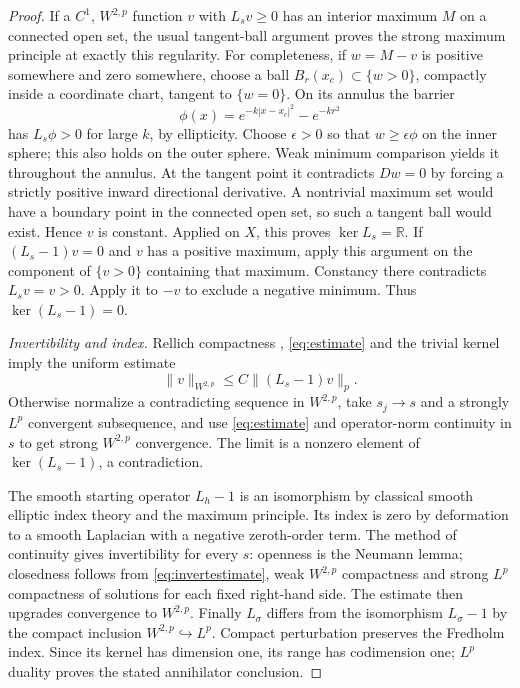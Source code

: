 \documentclass[11pt]{article}
\theoremstyle{remark}
\begin{document}
\begin{proof}
If a $C^1$, $W^{2,p}$ function $v$ with $L_sv\geq0$ has an interior
maximum $M$ on a connected open set, the usual tangent-ball argument
proves the strong maximum principle at exactly this regularity.
For completeness, if $w=M-v$ is positive somewhere and zero somewhere,
choose a ball $B_r(x_c)\subset\{w>0\}$, compactly inside a coordinate
chart, tangent to $\{w=0\}$. On its annulus the barrier
\[
 \phi(x)=e^{-k|x-x_c|^2}-e^{-kr^2}
\]
has $L_s\phi>0$ for large $k$, by ellipticity. Choose $\epsilon>0$
so that $w\geq\epsilon\phi$ on the inner sphere; this also holds on
the outer sphere. Weak minimum comparison yields it throughout the
annulus. At the tangent point it contradicts $Dw=0$ by forcing a strictly
positive inward directional derivative. A nontrivial maximum set would
have a boundary point in the connected open set, so such a tangent ball
would exist. Hence $v$ is constant. Applied on $X$, this proves
$\ker L_s=\mathbb R$. If $(L_s-1)v=0$ and $v$ has a positive maximum,
apply this argument on the component of $\{v>0\}$ containing that
maximum. Constancy there contradicts $L_sv=v>0$. Apply it to $-v$
to exclude a negative minimum. Thus $\ker(L_s-1)=0$.

\emph{Invertibility and index.}
Rellich compactness \cite[Chapter 13, equation (6.9)]{Taylor},
\eqref{eq:estimate} and the trivial kernel imply the uniform estimate
\begin{equation}\label{eq:invertestimate}
 \|v\|_{W^{2,p}}\leq C\|(L_s-1)v\|_p.
\end{equation}
Otherwise normalize a contradicting sequence in $W^{2,p}$, take
$s_j\to s$ and a strongly $L^p$ convergent subsequence, and use
\eqref{eq:estimate} and operator-norm continuity in $s$ to get strong
$W^{2,p}$ convergence. The limit is a nonzero element of
$\ker(L_s-1)$, a contradiction.

The smooth starting operator $L_h-1$ is an isomorphism by classical
smooth elliptic index theory and the maximum principle. Its index is
zero by deformation to a smooth Laplacian with a negative zeroth-order
term. The method of continuity gives invertibility for every $s$:
openness is the Neumann lemma; closedness follows from
\eqref{eq:invertestimate}, weak $W^{2,p}$ compactness and strong $L^p$
compactness of solutions for each fixed right-hand side. The estimate
then upgrades convergence to $W^{2,p}$.
Finally $L_\sigma$ differs from the isomorphism $L_\sigma-1$ by the
compact inclusion $W^{2,p}\hookrightarrow L^p$. Compact perturbation
preserves the Fredholm index. Since its kernel has dimension one,
its range has codimension one; $L^p$ duality proves the stated
annihilator conclusion.
\end{proof}
\end{document}
